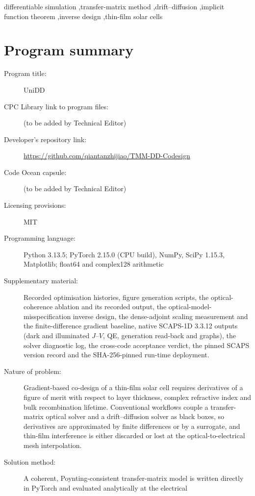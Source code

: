 \documentclass[preprint,12pt]{elsarticle}
\begin{document}
\begin{frontmatter}
\begin{keyword}
differentiable simulation \sep transfer-matrix method \sep drift--diffusion
\sep implicit function theorem \sep inverse design \sep thin-film solar cells
\end{keyword}

\end{frontmatter}

\section*{Program summary}

\begin{description}
\item[Program title:] UniDD
\item[CPC Library link to program files:] (to be added by Technical Editor)
\item[Developer's repository link:] \url{https://github.com/qiantanzhijiao/TMM-DD-Codesign}
\item[Code Ocean capsule:] (to be added by Technical Editor)
\item[Licensing provisions:] MIT
\item[Programming language:] Python 3.13.5; PyTorch 2.15.0 (CPU build),
NumPy, SciPy 1.15.3, Matplotlib; float64 and complex128 arithmetic
\item[Supplementary material:] Recorded optimisation histories, figure
generation scripts, the optical-coherence ablation and its recorded output,
the optical-model-misspecification inverse design, the dense-adjoint scaling
measurement and the finite-difference gradient baseline, native SCAPS-1D
3.3.12 outputs (dark and illuminated $J$--$V$, QE, generation read-back and
graphs), the solver diagnostic log, the cross-code acceptance verdict, the
pinned SCAPS version record and the SHA-256-pinned run-time deployment.
\item[Nature of problem:] Gradient-based co-design of a thin-film solar cell
requires derivatives of a figure of merit with respect to layer thickness,
complex refractive index and bulk recombination lifetime. Conventional
workflows couple a transfer-matrix optical solver and a drift--diffusion
solver as black boxes, so derivatives are approximated by finite differences
or by a surrogate, and thin-film interference is either discarded or lost at
the optical-to-electrical mesh interpolation.
\item[Solution method:] A coherent, Poynting-consistent transfer-matrix model
is written directly in PyTorch and evaluated analytically at the electrical

\end{description}
\end{document}
